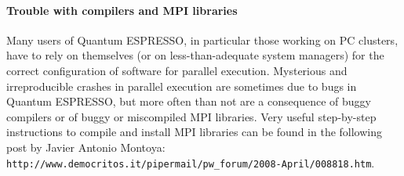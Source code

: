 \documentclass[12pt,a4paper]{article}
\def\qe{{\sc Quantum ESPRESSO}}
\begin{document}
\paragraph{Trouble with compilers and MPI libraries}
Many users of \qe, in particular those working on PC clusters,
have to rely on themselves (or on less-than-adequate system managers) for 
the correct configuration of software for parallel execution. Mysterious and
irreproducible crashes in parallel execution are sometimes due to bugs
in \qe, but more often than not are a consequence of buggy
compilers or of buggy or miscompiled MPI libraries. Very useful step-by-step 
instructions to compile and install MPI libraries
can be found in the following post by Javier Antonio Montoya:\\
\texttt{http://www.democritos.it/pipermail/pw\_forum/2008-April/008818.htm}.
\end{document}
